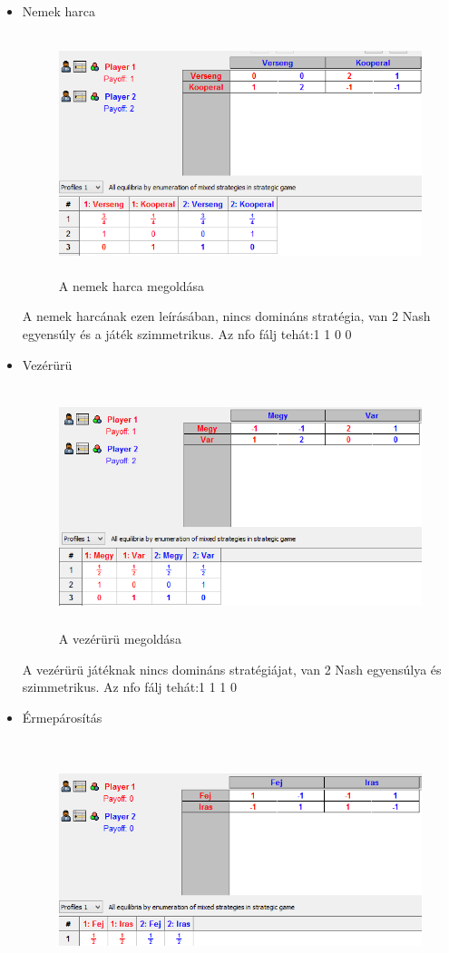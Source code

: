 \begin{itemize}
\item Nemek harca
		\begin{figure}[!h]
		\begin{center}
		\includegraphics[height=7cm]{figures/nemek.png}
		\caption{A nemek harca megoldása}
		\end{center}
		\end{figure}
A nemek harcának ezen leírásában, nincs domináns stratégia, van 2 Nash egyensúly és a játék szimmetrikus. Az nfo fálj tehát:1	1	0 0
\item Vezérürü
		\begin{figure}[!h]
		\begin{center}
		\includegraphics[height=7cm]{figures/uru.png}
		\caption{A vezérürü megoldása}
		\end{center}
		\end{figure}
A vezérürü játéknak nincs domináns stratégiájat, van 2 Nash egyensúlya és szimmetrikus. 
Az nfo fálj tehát:1	1	1 0
\item Érmepárosítás
		\begin{figure}[!h]
		\begin{center}
		\includegraphics[height=7cm]{figures/erme.png}

\end{center}
\end{figure}
\end{itemize}
